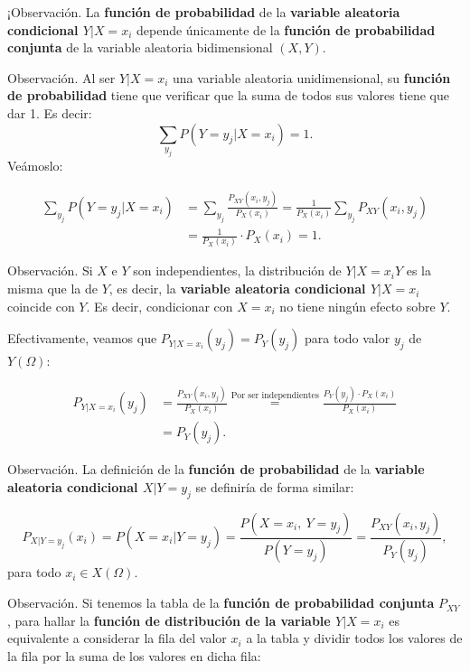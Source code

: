 \documentclass[]{book}
\begin{document}
¡Observación.
La \textbf{función de probabilidad} de la \textbf{variable aleatoria condicional \(Y|X=x_i\)} depende únicamente de la \textbf{función de probabilidad conjunta} de la variable aleatoria bidimensional \((X,Y)\).

Observación.
Al ser \(Y|X=x_i\) una variable aleatoria unidimensional, su \textbf{función de probabilidad} tiene que verificar que la suma de todos sus valores tiene que dar 1. Es decir:
\[
\sum_{y_j} P(Y=y_j|X=x_i)=1.
\]
Veámoslo:

\[
\begin{array}{rl}
\sum_{y_j} P(Y=y_j|X=x_i) &=\displaystyle \sum_{y_j} \frac{P_{XY}(x_i,y_j)}{P_X(x_i)}=\frac{1}{P_X(x_i)}\sum_{y_j} P_{XY}(x_i,y_j) \\ 
&=\frac{1}{P_X(x_i)}\cdot P_X(x_i)=1.
\end{array}
\]

Observación.
Si \(X\) e \(Y\) son independientes, la distribución de \(Y|X=x_iY\) es la misma que la de \(Y\), es decir, la \textbf{variable aleatoria condicional \(Y|X=x_i\)} coincide con \(Y\). Es decir, condicionar con \(X=x_i\) no tiene ningún efecto sobre \(Y\).

Efectivamente, veamos que \(P_{Y|X=x_i}(y_j)=P_Y(y_j)\) para todo valor \(y_j\) de \(Y(\Omega)\):

\[
\begin{array}{rl}
P_{Y|X=x_i}(y_j) &=\frac{P_{XY}(x_i,y_j)}{P_X(x_i)} \stackrel{\mbox{Por ser independientes}}{=}\frac{P_Y(y_j)\cdot P_X(x_i)}{P_X(x_i)}\\
& =P_Y(y_j).
\end{array}
\]

Observación.
La definición de la \textbf{función de probabilidad} de la \textbf{variable aleatoria condicional \(X|Y=y_j\)} se definiría de forma similar:

\[
P_{X|Y=y_j}(x_i)=P(X=x_i|Y=y_j)=\frac{P(X=x_i,\ Y=y_j)}{P(Y=y_j)}=\frac{P_{XY}(x_i,y_j)}{P_Y(y_j)}, 
\]
para todo \(x_i\in X(\Omega)\).

Observación.
Si tenemos la tabla de la \textbf{función de probabilidad conjunta} \(P_{XY}\), para hallar la \textbf{función de distribución de la variable \(Y|X=x_i\)} es equivalente a considerar la fila del valor \(x_i\) a la tabla y dividir todos los valores de la fila por la suma de los valores en dicha fila:
\end{document}
